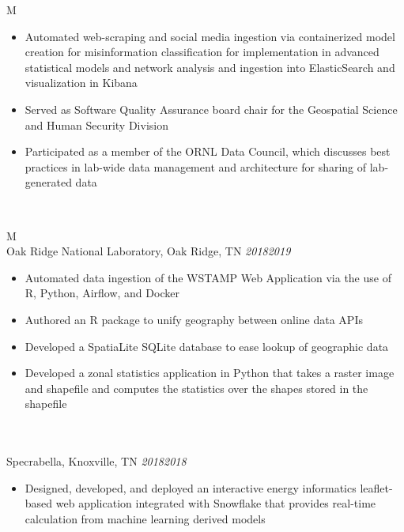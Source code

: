 \documentclass[10pt]{article}%
\begin{document}
\begin{tabularx}{\linewidth}{M}
\begin{itemize}[topsep=-12pt,parsep=0em]
          \item Automated web-scraping and social media ingestion via containerized model creation for misinformation classification for implementation in advanced statistical models and network analysis and ingestion into ElasticSearch and visualization in Kibana %
          \item Served as Software Quality Assurance board chair for the Geospatial Science and Human Security Division %
          \item Participated as a member of the ORNL Data Council, which discusses best practices in lab-wide data management and architecture for sharing of lab-generated data %
      \end{itemize} \\
   \end{tabularx}
   \begin{tabularx}{\linewidth}{M}%
            \\
      Oak Ridge National Laboratory, Oak Ridge, TN \textit{2018\textemdash{}2019} \\
      \begin{itemize}[topsep=-12pt,parsep=0em]
          \setlength\itemsep{0em}
          \item Automated data ingestion of the WSTAMP Web Application via the use of R, Python, Airflow, and Docker %
          \item Authored an R package to unify geography between online data APIs %
          \item Developed a SpatiaLite SQLite database to ease lookup of geographic data %
          \item Developed a zonal statistics application in Python that takes a raster image and shapefile and computes the statistics over the shapes stored in the shapefile %
        \end{itemize} \\
          \\
         Specrabella, Knoxville, TN \textit{2018\textemdash{}2018} \\
      \begin{itemize}[topsep=-12pt,parsep=0em]
         \setlength\itemsep{0em}
         \item Designed, developed, and deployed an interactive energy informatics leaflet-based web application integrated with Snowflake that provides real-time calculation from machine learning derived models %

\end{itemize}
\end{tabularx}
\end{document}
